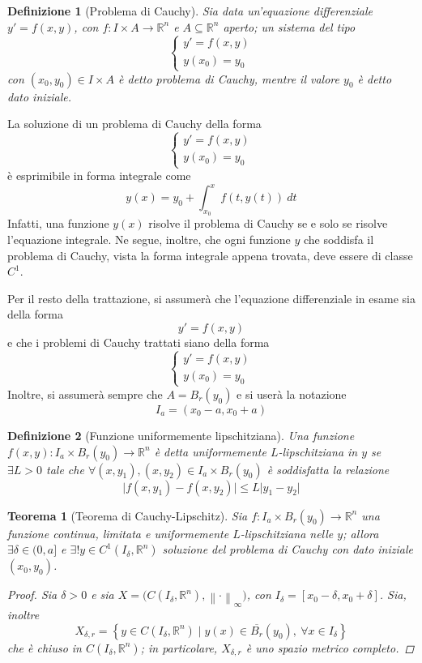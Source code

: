 \documentclass[12pt]{scrartcl}
\theoremstyle{style}
\newtheorem{definizione}{Definizione}[section]
\newtheorem{teorema}{Teorema}[section]
\newenvironment{boxenv}[1][]{
    \begin{eqbox}[#1]
    }{
   \end{eqbox}
}
\numberwithin{equation}{subsection}
\begin{document}
\begin{definizione}
	[Problema di Cauchy]
	Sia data un'equazione differenziale $y' = f(x,y)$, con $f : I \times A \to \mathbb{R}^n$ e $A \subseteq \mathbb{R}^n$ aperto; un sistema del tipo
	\[
	\begin{cases}
		y' = f(x,y)\\
		y(x_0) = y_0
	\end{cases}
	\] 
	con $(x_0,y_0) \in I \times A$ \`e detto \textit{problema di Cauchy}, mentre il valore $y_0$ \`e detto \textit{dato iniziale}.
\end{definizione}
\noindent La soluzione di un problema di Cauchy della forma
\[
\begin{cases}
	y' = f(x,y)\\
	y(x_0) = y_0
\end{cases}
\] 
\`e esprimibile in forma integrale come
\begin{equation}
	y(x) = y_0 + \int_{x_0} ^x f(t,y(t)) \ dt
\end{equation}
Infatti, una funzione $y(x)$ risolve il problema di Cauchy se e solo se risolve l'equazione integrale.
Ne segue, inoltre, che ogni funzione $y$ che soddisfa il problema di Cauchy, vista la forma integrale appena trovata, deve essere di classe $C^1$.
\begin{boxenv}[]
Per il resto della trattazione, si assumer\`a che l'equazione differenziale in esame sia della forma
\[
y'=f(x,y)
\] 
e che i problemi di Cauchy trattati siano della forma
\[
\begin{cases}
	y'  = f(x,y)\\
	y(x_0) = y_0
\end{cases}
\] 
Inoltre, si assumer\`a sempre che $A = B_r(y_0)$ e si user\`a la notazione
\[
I_a = (x_0-a,x_0+a)
\] 
\end{boxenv}
\begin{definizione}
		[Funzione uniformemente lipschitziana]
		Una funzione $f(x,y) : I_a \times B_r(y_0)\to \mathbb{R}^n$ \`e detta \textit{uniformemente $L$-lipschitziana} in $y$ se $\exists L>0$ tale che $\forall (x,y_1), (x,y_2) \in I_a \times B_r(y_0)$ \`e soddisfatta la relazione
		\[
		\lvert f(x,y_1) - f(x,y_2) \rvert \le L\lvert y_1-y_2 \rvert 
		\] 
\end{definizione}
\begin{teorema}
	[Teorema di Cauchy-Lipschitz]
	Sia $f : I_a \times B_r(y_0)\to \mathbb{R}^n$ una funzione continua, limitata e uniformemente $L$-lipschitziana nelle $y$; allora $\exists \delta \in (0,a]$ e $\exists ! y \in C^1(I_\delta ,\mathbb{R}^n)$ soluzione del problema di Cauchy con dato iniziale $(x_0,y_0)$.
	\begin{proof}
		Sia $\delta >0$ e sia $X = \big(C(I_\delta ,\mathbb{R}^n),\left\lVert \cdot  \right\rVert _\infty\big)$, con $I_\delta = [x_0-\delta ,x_0+\delta ]$.
		Sia, inoltre
		\[
		X_{\delta ,r} = \left\{ y \in C(I_\delta ,\mathbb{R}^n) \mid y(x) \in \overline{B_r}(y_0), \ \forall x \in I_\delta  \right\} 
		\] 
		che \`e chiuso in $C(I_\delta ,\mathbb{R}^n)$; in particolare, $X_{\delta ,r} $ \`e uno spazio metrico completo.
	\end{proof}
\end{teorema}
\end{document}
